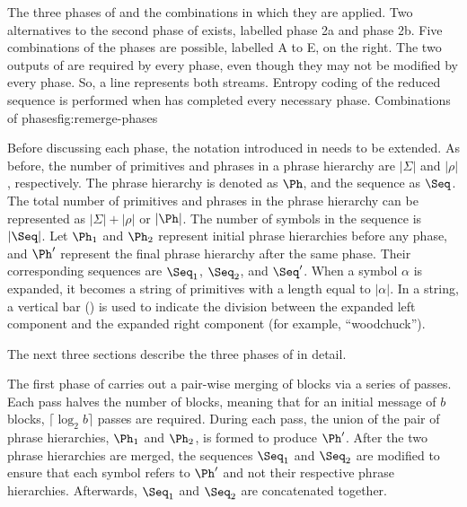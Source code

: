 \fig{}
{The three phases of \remerge and the combinations in 
which they are applied.  Two alternatives to the 
second phase of \remerge exists, labelled phase 2a and
phase 2b.  Five combinations of the \remerge phases 
are possible, labelled A to E, on the right.  The two outputs of
\repair are required by every \remerge phase, even though
they may not be modified by every phase.  So, a line
represents both streams.  Entropy coding of the 
reduced sequence is performed when \remerge has completed
every necessary phase.}
{Combinations of \remerge phases}{fig:remerge-phases}

Before discussing each phase, the notation introduced in 
 needs to be extended.  As before,
the number of primitives and phrases in a phrase hierarchy
are $|\Sigma|$ and $|\rho|$, respectively.  The phrase
hierarchy is denoted as $\Ph$, and the sequence as $\Seq$.
The total number of primitives and phrases in the phrase
hierarchy can be represented as $|\Sigma| + |\rho|$ or
$|\Ph|$.  The number of symbols in the
sequence is $|\Seq|$.  Let
$\Ph_1$ and $\Ph_2$ 
represent initial phrase hierarchies before any phase, and
$\Ph'$ represent the final
phrase hierarchy after the same phase.  Their corresponding 
sequences are $\Seq_1$, $\Seq_2$, and 
$\Seq'$.  When a symbol $\alpha$ 
is expanded, it becomes a string of primitives with a
length equal to $|\alpha|$.  In a string, 
a vertical bar (\textbar) is used to indicate
the division between the expanded left component and the
expanded right component (for example, ``wood{\textbar}chuck'').

The next three sections describe the three phases of \remerge
in detail.


The first phase of \remerge carries out a pair-wise 
merging of blocks via a series of passes.  Each pass 
halves the number of blocks, meaning that for an initial
message of $b$ blocks, $\lceil \log_2 b \rceil$
passes are required.  During each pass, the union of the
pair of phrase hierarchies, $\Ph_1$ 
and $\Ph_2$, is formed to produce $\Ph'$.  
After the two phrase hierarchies
are merged, the sequences $\Seq_1$ and 
$\Seq_2$ are modified to ensure that each symbol refers 
to $\Ph'$ and not their respective phrase 
hierarchies.  Afterwards, $\Seq_1$ and $\Seq_2$ are concatenated 
together.

